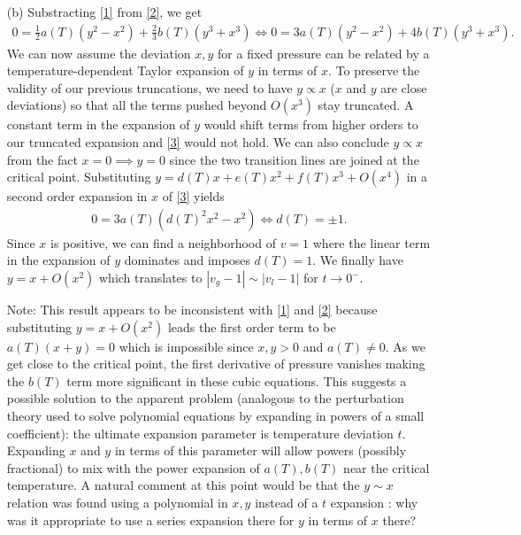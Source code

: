 \documentclass[10pt, a4paper]{article}
\begin{document}
{\begin{enumerate}
  \item[(b)] Substracting \eqref{1} from \eqref{2}, we get 
  \begin{align*}
    0 = \frac{1}{2}a(T) (y^2 - x^2) + \frac{2}{3}b(T) (y^3 + x^3) \iff 0 = 3a(T) (y^2 - x^2) + 4 b(T) (y^3 + x^3).  \tag{$\star\star\star$} \label{3}
  \end{align*}
  We can now assume the deviation $x, y$ for a fixed pressure can be related by a temperature-dependent Taylor expansion of $y$ in terms of $x$. To preserve the validity of our previous truncations, we need to have $y \propto x$ ($x$ and $y$ are close deviations) so that all the terms pushed beyond $O(x^3)$ stay truncated. A constant term in the expansion of $y$ would shift terms from higher orders to our truncated expansion and \eqref{3} would not hold. We can also conclude $y \propto x$ from the fact $x=0 \implies y=0$ since the two transition lines are joined at the critical point. Substituting $y = d(T) x + e(T) x^2 + f(T) x^3 + O(x^4)$ in a second order expansion in $x$ of \eqref{3} yields 
  \begin{align*}
    0 = 3a(T) (d(T)^2 x^2 - x^2) \iff d(T) = \pm 1. 
  \end{align*}
  Since $x$ is positive, we can find a neighborhood of $v=1$ where the linear term in the expansion of $y$ dominates and imposes $d(T) = 1$. We finally have $y = x + O(x^2)$ which translates to $|v_g-1| \sim |v_l-1|$ for $t \to 0^-$.

  Note: This result appears to be inconsistent with \eqref{1} and \eqref{2} because substituting $y = x + O(x^2)$ leads the first order term to be $a(T)(x + y) = 0$ which is impossible since $x, y > 0$ and $a(T) \neq 0$. As we get close to the critical point, the first derivative of pressure vanishes making the $b(T)$ term more significant in these cubic equations. This suggests a possible solution to the apparent problem (analogous to the perturbation theory used to solve polynomial equations by expanding in powers of a small coefficient): the ultimate expansion parameter is temperature deviation $t$. Expanding $x$ and $y$ in terms of this parameter will allow powers (possibly fractional) to mix with the power expansion of $a(T), b(T)$ near the critical temperature. A natural comment at this point would be that the $y\sim x$ relation was found using a polynomial in $x, y$ instead of a $t$ expansion : why was it appropriate to use a series expansion there for $y$ in terms of $x$ there?  
\end{enumerate}

}
\end{document}
